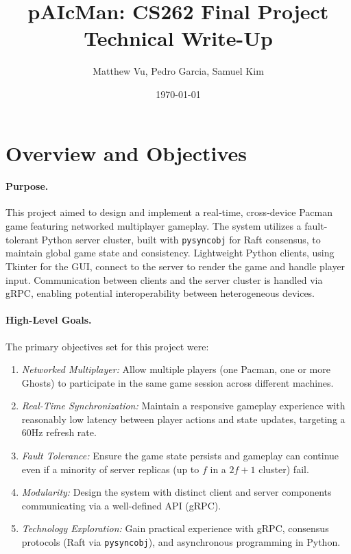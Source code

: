 \documentclass[11pt]{article}
\title{pAIcMan: CS262 Final Project\\Technical Write-Up}
\author{Matthew Vu, Pedro Garcia, Samuel Kim}
\date{\today}
\begin{document}
\maketitle

\section{Overview and Objectives}
\paragraph{Purpose.}
This project aimed to design and implement a real‐time, cross‐device Pacman game featuring networked multiplayer gameplay. The system utilizes a fault-tolerant Python server cluster, built with \texttt{pysyncobj} for Raft consensus, to maintain global game state and consistency. Lightweight Python clients, using Tkinter for the GUI, connect to the server to render the game and handle player input. Communication between clients and the server cluster is handled via gRPC, enabling potential interoperability between heterogeneous devices.

\paragraph{High-Level Goals.}
The primary objectives set for this project were:
\begin{enumerate}
  \item \emph{Networked Multiplayer:} Allow multiple players (one Pacman, one or more Ghosts) to participate in the same game session across different machines.
  \item \emph{Real-Time Synchronization:} Maintain a responsive gameplay experience with reasonably low latency between player actions and state updates, targeting a 60Hz refresh rate.
  \item \emph{Fault Tolerance:} Ensure the game state persists and gameplay can continue even if a minority of server replicas (up to $f$ in a $2f+1$ cluster) fail.
  \item \emph{Modularity:} Design the system with distinct client and server components communicating via a well-defined API (gRPC).
  \item \emph{Technology Exploration:} Gain practical experience with gRPC, consensus protocols (Raft via \texttt{pysyncobj}), and asynchronous programming in Python.
\end{enumerate}
\end{document}
